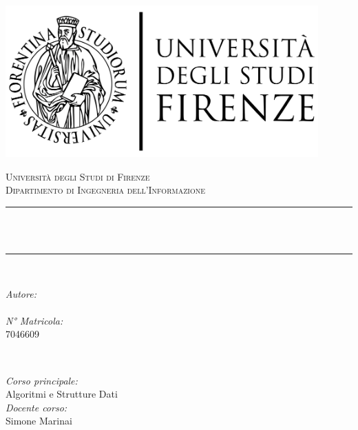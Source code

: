 \begin{titlepage}

\newcommand{\HRule}{\rule{\linewidth}{0.5mm}}

\center
\includegraphics[width=12cm]{Resources/firenze2.png}\\[1cm]

\center

\textsc{\LARGE Università degli Studi di Firenze}\\[0.5cm]
\textsc{\Large Dipartimento di Ingegneria dell'Informazione}\\[0.5cm]

\makeatletter
\HRule \\[1cm]
{ \huge \bfseries \@title}\\[0.7cm]
\HRule \\[1.5cm]

\begin{minipage}{0.4\textwidth}
\begin{flushleft} \large
\emph{Autore:}\\
\@author %
\\[1.2em]
\emph{N° Matricola:}\\
7046609 \\[1.2em]
\end{flushleft}
\end{minipage}
~
\begin{minipage}{0.4\textwidth}
\begin{flushright} \large
\emph{Corso principale:} \\
Algoritmi e Strutture Dati  \\[1.2em]
\emph{Docente corso:} \\
Simone Marinai
\end{flushright}
\end{minipage}\\[2cm]
\makeatother

\vfill

\end{titlepage}
